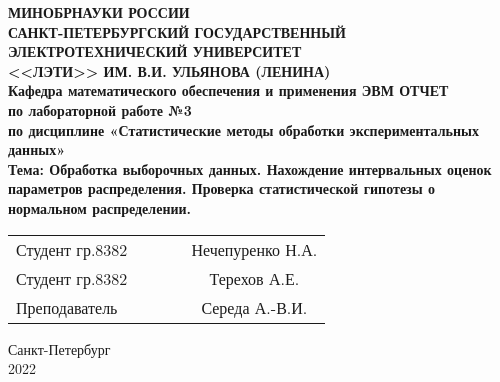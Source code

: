 \begin{titlepage}

\begin{center}
\textbf{
МИНОБРНАУКИ РОССИИ \\
САНКТ-ПЕТЕРБУРГСКИЙ ГОСУДАРСТВЕННЫЙ \\
ЭЛЕКТРОТЕХНИЧЕСКИЙ УНИВЕРСИТЕТ \\
<<ЛЭТИ>> ИМ. В.И. УЛЬЯНОВА (ЛЕНИНА) \\
Кафедра математического обеспечения и применения ЭВМ
\vfill
ОТЧЕТ\\
по лабораторной работе №3\\
по дисциплине «Статистические методы обработки экспериментальных данных»\\
Тема: Обработка выборочных данных. Нахождение интервальных оценок параметров распределения. Проверка статистической гипотезы о нормальном распределении.
\vfill
}
\begin{tabular}{ l c c c c }
 Студент гр.8382 & \hspace{2cm} & \underline{\hspace{4cm}} & \hspace{1cm} & Нечепуренко Н.А. \\
 Студент гр.8382 & \hspace{2cm} & \underline{\hspace{4cm}} & \hspace{1cm} & Терехов А.Е. \\
 Преподаватель & \hspace{2cm} & \underline{\hspace{4cm}} & \hspace{1cm} & Середа А.-В.И.
\end{tabular}

\vspace{3cm}

Санкт-Петербург\\
2022
\end{center}

\end{titlepage}
